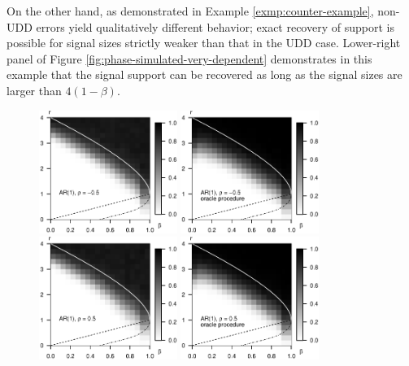 On the other hand, as demonstrated in Example \ref{exmp:counter-example}, non-UDD errors yield qualitatively different behavior; exact recovery of support is possible for signal sizes strictly weaker than that in the UDD case. 
Lower-right panel of Figure \ref{fig:phase-simulated-very-dependent} demonstrates in this example that the signal support can be recovered as long as the signal sizes are larger than $4(1-\beta)$.

\begin{figure}
    \centering
    \includegraphics[width=0.4\textwidth]{./figures/simulated_phase_diagram_AR-05_p10000.eps}
    \includegraphics[width=0.4\textwidth]{./figures/simulated_phase_diagram_AR-05_p10000_oracle.eps}
    \includegraphics[width=0.4\textwidth]{./figures/simulated_phase_diagram_AR05_p10000.eps}
    \includegraphics[width=0.4\textwidth]{./figures/simulated_phase_diagram_AR05_p10000_oracle.eps}

\end{figure}
